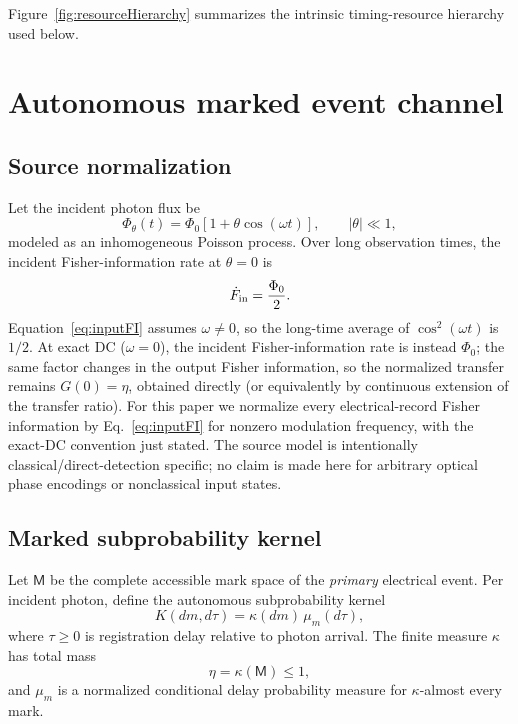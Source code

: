 \documentclass[aps,prapplied,preprint,nofootinbib]{revtex4-2}
\newcommand{\M}{\mathsf M}
\begin{document}
Figure~\ref{fig:resourceHierarchy} summarizes the intrinsic timing-resource hierarchy used below.



\section{Autonomous marked event channel}

\subsection{Source normalization}

Let the incident photon flux be
\begin{equation}
\Phi_\theta(t)=\Phi_0[1+\theta\cos(\omega t)],\qquad |\theta|\ll1,
\label{eq:source}
\end{equation}
modeled as an inhomogeneous Poisson process. Over long observation times, the incident Fisher-information rate at $\theta=0$ is
\begin{equation}
\dot F_{\rm in}=\frac{\Phi_0}{2}.
\label{eq:inputFI}
\end{equation}
Equation~\eqref{eq:inputFI} assumes $\omega\ne0$, so the long-time average of $\cos^2(\omega t)$ is $1/2$. At exact DC ($\omega=0$), the incident Fisher-information rate is instead $\Phi_0$; the same factor changes in the output Fisher information, so the normalized transfer remains $G(0)=\eta$, obtained directly (or equivalently by continuous extension of the transfer ratio).
For this paper we normalize every electrical-record Fisher information by Eq.~\eqref{eq:inputFI} for nonzero modulation frequency, with the exact-DC convention just stated. The source model is intentionally classical/direct-detection specific; no claim is made here for arbitrary optical phase encodings or nonclassical input states.

\subsection{Marked subprobability kernel}

Let $\M$ be the complete accessible mark space of the \emph{primary} electrical event. Per incident photon, define the autonomous subprobability kernel
\begin{equation}
K(dm,d\tau)=\kappa(dm)\,\mu_m(d\tau),
\label{eq:kernel}
\end{equation}
where $\tau\ge0$ is registration delay relative to photon arrival. The finite measure $\kappa$ has total mass
\begin{equation}
\eta=\kappa(\M)\le1,
\end{equation}
and $\mu_m$ is a normalized conditional delay probability measure for $\kappa$-almost every mark.
\end{document}
